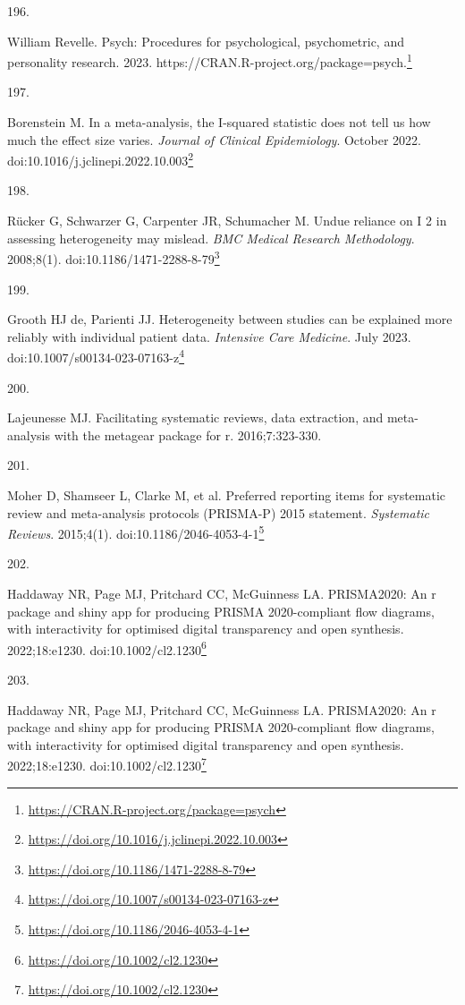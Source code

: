 \documentclass[
  a4paper,
]{book}
\newlength{\cslhangindent}
\newlength{\csllabelwidth}
\newlength{\cslentryspacingunit} %
\newenvironment{CSLReferences}[2] %
 {%
  \setlength{\parindent}{0pt}
  \ifodd #1
  \let\oldpar\par
  \def\par{\hangindent=\cslhangindent\oldpar}
  \fi
  \setlength{\parskip}{#2\cslentryspacingunit}
 }%
 {}
\newcommand{\CSLLeftMargin}[1]{\parbox[t]{\csllabelwidth}{#1}}
\newcommand{\CSLRightInline}[1]{\parbox[t]{\linewidth - \csllabelwidth}{#1}\break}
\renewcommand{\href}[2]{#2\footnote{\url{#1}}}
\begin{document}
\begin{CSLReferences}{0}{0}
\leavevmode{}%
\CSLLeftMargin{196. }%
\CSLRightInline{William Revelle. Psych: Procedures for psychological, psychometric, and personality research. 2023. \href{https://CRAN.R-project.org/package=psych}{https://CRAN.R-project.org/package=psych.}}

\leavevmode{}%
\CSLLeftMargin{197. }%
\CSLRightInline{Borenstein M. In a meta-analysis, the I-squared statistic does not tell us how much the effect size varies. \emph{Journal of Clinical Epidemiology}. October 2022. doi:\href{https://doi.org/10.1016/j.jclinepi.2022.10.003}{10.1016/j.jclinepi.2022.10.003}}

\leavevmode{}%
\CSLLeftMargin{198. }%
\CSLRightInline{Rücker G, Schwarzer G, Carpenter JR, Schumacher M. Undue reliance on I 2 in assessing heterogeneity may mislead. \emph{BMC Medical Research Methodology}. 2008;8(1). doi:\href{https://doi.org/10.1186/1471-2288-8-79}{10.1186/1471-2288-8-79}}

\leavevmode{}%
\CSLLeftMargin{199. }%
\CSLRightInline{Grooth HJ de, Parienti JJ. Heterogeneity between studies can be explained more reliably with individual patient data. \emph{Intensive Care Medicine}. July 2023. doi:\href{https://doi.org/10.1007/s00134-023-07163-z}{10.1007/s00134-023-07163-z}}

\leavevmode{}%
\CSLLeftMargin{200. }%
\CSLRightInline{Lajeunesse MJ. Facilitating systematic reviews, data extraction, and meta-analysis with the metagear package for r. 2016;7:323-330.}

\leavevmode{}%
\CSLLeftMargin{201. }%
\CSLRightInline{Moher D, Shamseer L, Clarke M, et al. Preferred reporting items for systematic review and meta-analysis protocols (PRISMA-P) 2015 statement. \emph{Systematic Reviews}. 2015;4(1). doi:\href{https://doi.org/10.1186/2046-4053-4-1}{10.1186/2046-4053-4-1}}

\leavevmode{}%
\CSLLeftMargin{202. }%
\CSLRightInline{Haddaway NR, Page MJ, Pritchard CC, McGuinness LA. PRISMA2020: An r package and shiny app for producing PRISMA 2020-compliant flow diagrams, with interactivity for optimised digital transparency and open synthesis. 2022;18:e1230. doi:\href{https://doi.org/10.1002/cl2.1230}{10.1002/cl2.1230}}

\leavevmode{}%
\CSLLeftMargin{203. }%
\CSLRightInline{Haddaway NR, Page MJ, Pritchard CC, McGuinness LA. PRISMA2020: An r package and shiny app for producing PRISMA 2020-compliant flow diagrams, with interactivity for optimised digital transparency and open synthesis. 2022;18:e1230. doi:\href{https://doi.org/10.1002/cl2.1230}{10.1002/cl2.1230}}


\end{CSLReferences}
\end{document}

